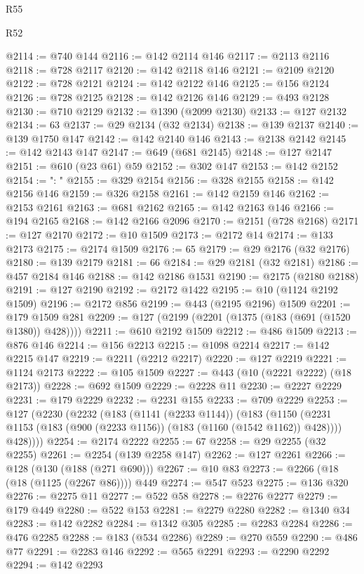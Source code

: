 \begin{lexlean}{R55}
\begin{lexlean}{R52}
\begin{coremodule}
{{{{{{{{{{{{{{{{{{{{{{{{{{{{{{{{{{{{{{{{{{{{{{{{{{{{{{{{{{{{{{{{{{{{{{{{{{{{{{{{{{{{{{{{{{{{{{{{{{{{{{{{{{{{{{{{{{{{{{{{{{{{{{{{{{{{{{{{{{{{{{{{{{{{{{{{{{{{{{{{{{{{{{{{{{{{{{{{{{{{{{{{{{{{{{{{{{{{{{@2114 := @740 @144
@2116 := @142 @2114 @146
@2117 := @2113 @2116
@2118 := @728 @2117
@2120 := @142 @2118 @146
@2121 := @2109 @2120
@2122 := @728 @2121
@2124 := @142 @2122 @146
@2125 := @156 @2124
@2126 := @728 @2125
@2128 := @142 @2126 @146
@2129 := @493 @2128
@2130 := @710 @2129
@2132 := @1390 (@2099 @2130)
@2133 := @127 @2132
@2134 := 63
@2137 := @29 @2134 (@32 @2134)
@2138 := @139 @2137
@2140 := @139 @1750 @147
@2142 := @142 @2140 @146
@2143 := @2138 @2142
@2145 := @142 @2143 @147
@2147 := @649 (@681 @2145)
@2148 := @127 @2147
@2151 := @610 (@23 @61) @59
@2152 := @302 @147
@2153 := @142 @2152
@2154 := ": "
@2155 := @329 @2154
@2156 := @328 @2155
@2158 := @142 @2156 @146
@2159 := @326 @2158
@2161 := @142 @2159 @146
@2162 := @2153 @2161
@2163 := @681 @2162
@2165 := @142 @2163 @146
@2166 := @194 @2165
@2168 := @142 @2166 @2096
@2170 := @2151 (@728 @2168)
@2171 := @127 @2170
@2172 := @10 @1509
@2173 := @2172 @14
@2174 := @133 @2173
@2175 := @2174 @1509
@2176 := 65
@2179 := @29 @2176 (@32 @2176)
@2180 := @139 @2179
@2181 := 66
@2184 := @29 @2181 (@32 @2181)
@2186 := @457 @2184 @146
@2188 := @142 @2186 @1531
@2190 := @2175 (@2180 @2188)
@2191 := @127 @2190
@2192 := @2172 @1422
@2195 := @10 (@1124 @2192 @1509)
@2196 := @2172 @856
@2199 := @443 (@2195 @2196) @1509
@2201 := @179 @1509 @281
@2209 := @127 (@2199 (@2201 (@1375 (@183 (@691 (@1520 @1380)) @428))))
@2211 := @610 @2192 @1509
@2212 := @486 @1509
@2213 := @876 @146
@2214 := @156 @2213
@2215 := @1098 @2214
@2217 := @142 @2215 @147
@2219 := @2211 (@2212 @2217)
@2220 := @127 @2219
@2221 := @1124 @2173
@2222 := @105 @1509
@2227 := @443 (@10 (@2221 @2222) (@18 @2173))
@2228 := @692 @1509
@2229 := @2228 @11
@2230 := @2227 @2229
@2231 := @179 @2229
@2232 := @2231 @155
@2233 := @709 @2229
@2253 := @127
    (@2230
      (@2232
        (@183
          (@1141 (@2233 @1144))
          (@183
            (@1150 (@2231 @1153 (@183 (@900 (@2233 @1156)) (@183 (@1160 (@1542 @1162)) @428))))
            @428))))
@2254 := @2174 @2222
@2255 := 67
@2258 := @29 @2255 (@32 @2255)
@2261 := @2254 (@139 @2258 @147)
@2262 := @127 @2261
@2266 := @128 (@130 (@188 (@271 @690)))
@2267 := @10 @83
@2273 := @2266 (@18 (@18 (@1125 (@2267 @86)))) @449
@2274 := @547 @523
@2275 := @136 @320
@2276 := @2275 @11
@2277 := @522 @58
@2278 := @2276 @2277
@2279 := @179 @449
@2280 := @522 @153
@2281 := @2279 @2280
@2282 := @1340 @34
@2283 := @142 @2282
@2284 := @1342 @305
@2285 := @2283 @2284
@2286 := @476 @2285
@2288 := @183 (@534 @2286)
@2289 := @270 @559
@2290 := @486 @77
@2291 := @2283 @146
@2292 := @565 @2291
@2293 := @2290 @2292
@2294 := @142 @2293
}}}}}}}}}}}}}}}}}}}}}}}}}}}}}}}}}}}}}}}}}}}}}}}}}}}}}}}}}}}}}}}}}}}}}}}}}}}}}}}}}}}}}}}}}}}}}}}}}}}}}}}}}}}}}}}}}}}}}}}}}}}}}}}}}}}}}}}}}}}}}}}}}}}}}}}}}}}}}}}}}}}}}}}}}}}}}}}}}}}}}}}}}}}}}}}}}}}}}}
\end{coremodule}
\end{lexlean}
\end{lexlean}
